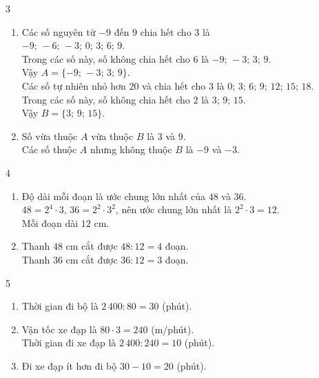 \begin{Solbook}{3}
 \par \noindent  \begin {enumerate} \item Các số nguyên từ $-9$ đến $9$ chia hết cho $3$ là\\ $-9;\,-6;\,-3;\,0;\,3;\,6;\,9$.\\ Trong các số này, số không chia hết cho $6$ là $-9;\,-3;\,3;\,9$.\\ Vậy $A=\{-9;\,-3;\,3;\,9\}$.\\ Các số tự nhiên nhỏ hơn $20$ và chia hết cho $3$ là $0;\,3;\,6;\,9;\,12;\,15;\,18$.\\ Trong các số này, số không chia hết cho $2$ là $3;\,9;\,15$.\\ Vậy $B=\{3;\,9;\,15\}$. \item Số vừa thuộc $A$ vừa thuộc $B$ là $3$ và $9$.\\ Các số thuộc $A$ nhưng không thuộc $B$ là $-9$ và $-3$. \end {enumerate}  \hfill \qedEX 
\end{Solbook}
\begin{Solbook}{4}
 \par \noindent  \begin {enumerate} \item Độ dài mỗi đoạn là ước chung lớn nhất của $48$ và $36$.\\ $48=2^{4}\cdot 3$, $36=2^{2}\cdot 3^{2}$, nên ước chung lớn nhất là $2^{2}\cdot 3=12$.\\ Mỗi đoạn dài $12$ cm. \item Thanh $48$ cm cắt được $48:12=4$ đoạn.\\ Thanh $36$ cm cắt được $36:12=3$ đoạn. \end {enumerate}  \hfill \qedEX 
\end{Solbook}
\begin{Solbook}{5}
 \par \noindent  \begin {enumerate} \item Thời gian đi bộ là $2\,400:80=30$ (phút). \item Vận tốc xe đạp là $80\cdot 3=240$ (m/phút).\\ Thời gian đi xe đạp là $2\,400:240=10$ (phút). \item Đi xe đạp ít hơn đi bộ $30-10=20$ (phút). \end {enumerate}  \hfill \qedEX 
\end{Solbook}
